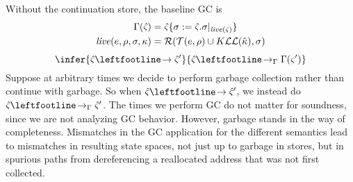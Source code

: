 Without the continuation store, the baseline GC is
\begin{align*}
  \Gamma(\hat\varsigma) &= \hat\varsigma\{ \sigma:=\hat\varsigma.\sigma|_{\mathit{live}(\hat\varsigma)} \} \\
  \mathit{live}(e,\rho,\sigma,\kappa) &= {\mathcal R}({\mathcal T}(e,\rho)\cup K{\mathcal L}{\mathcal L}({\hat{\kappa}}), \sigma)
\end{align*}
\begin{equation*}
  \infer{\mastate \stepto \mastate'}
        {\mastate \stepto_{\Gamma} \Gamma(\mstate')}  
\end{equation*}
Suppose at arbitrary times we decide to perform garbage collection rather than continue with garbage.
%
So when $\mastate \stepto \mastate'$, we instead do $\mastate \stepto_\Gamma \mastate'$.
%
The times we perform GC do not matter for soundness, since we are not analyzing GC behavior.
%
However, garbage stands in the way of completeness.
%
Mismatches in the GC application for the different semantics lead to mismatches in resulting state spaces, not just up to garbage in stores, but in spurious paths from dereferencing a reallocated address that was not first collected.
%

